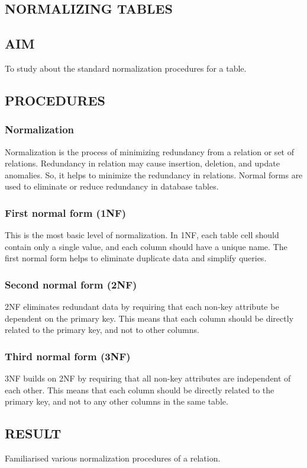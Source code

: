 \documentclass{article}
\begin{document}
\begin{flushleft}
\text{}
\newpage
\section{NORMALIZING TABLES}
\hrulefill
\vspace{1cm}
\subsection{AIM}
To study about the standard normalization procedures for a table.
\subsection{PROCEDURES}
\subsubsection{Normalization}
Normalization is the process of minimizing redundancy from a relation or set of relations. Redundancy in relation may cause insertion, deletion, and update anomalies. So, it helps to minimize the redundancy in relations. Normal forms are used to eliminate or reduce redundancy in database tables.
\subsubsection{First normal form (1NF)}
This is the most basic level of normalization. In 1NF, each table cell should contain only a single value, and each column should have a unique name. The first normal form helps to eliminate duplicate data and simplify queries.
\subsubsection{Second normal form (2NF)}
2NF eliminates redundant data by requiring that each non-key attribute be dependent on the primary key. This means that each column should be directly related to the primary key, and not to other columns.
\subsubsection{Third normal form (3NF)}
3NF builds on 2NF by requiring that all non-key attributes are independent of each other. This means that each column should be directly related to the primary key, and not to any other columns in the same table.
\subsection{RESULT}
Familiarised various normalization procedures of a relation.
\end{flushleft}
\newpage
{}
\text{}
\newpage
\end{document}
